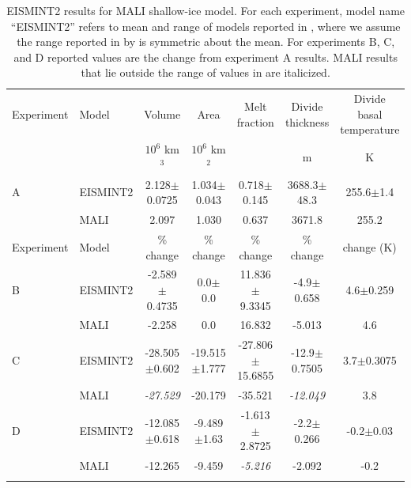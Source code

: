 \begin{table}[t]
\caption{EISMINT2 results for MALI shallow-ice model.
For each experiment, model name ``EISMINT2'' refers to mean and range of models reported in \citet{payne2000}, 
where we assume the range reported in by \citet{payne2000} is symmetric about the mean.
For experiments B, C, and D reported values are the change from experiment A results.
MALI results that lie outside the range of values in \citet{payne2000} are italicized.
}
\begin{tabular}{llccccc}
\tophline
Experiment & Model  &  Volume & Area & Melt fraction & Divide thickness & Divide basal temperature \\
           &        &  $10^6$ km$^3$ & $10^6$ km$^2$ & & m & K \\
\middlehline
A          & EISMINT2 & 2.128$\pm$0.0725 & 1.034$\pm$0.043 & 0.718$\pm$0.145 & 3688.3$\pm$48.3 & 255.6$\pm$1.4  \\
           & MALI   & 2.097          & 1.030         & 0.637         & 3671.8        & 255.2  \\  %
\middlehline
Experiment & Model  &  \% change & \% change & \% change & \% change & change (K)\\
\middlehline
B          & EISMINT2 & -2.589$\pm$0.4735 & 0.0$\pm$0.0 & 11.836$\pm$9.3345 & -4.9$\pm$0.658 & 4.6$\pm$0.259  \\
           & MALI   & -2.258   & 0.0 & 16.832 & -5.013 & 4.6  \\  %
C          & EISMINT2 & -28.505$\pm$0.602 & -19.515$\pm$1.777 & -27.806$\pm$15.6855 & -12.9$\pm$0.7505 & 3.7$\pm$0.3075\\
           & MALI   & \it{-27.529} & -20.179 & -35.521 & \it{-12.049} & 3.8  \\    %
D          & EISMINT2 & -12.085$\pm$0.618 & -9.489$\pm$1.63 & -1.613$\pm$2.8725 & -2.2$\pm$0.266 & -0.2$\pm$0.03 \\
           & MALI   & -12.265 & -9.459 & \it{-5.216} & -2.092 & -0.2  \\        %
\bottomhline
\end{tabular}
\belowtable{} %
 \label{table-EISMINT2}
\end{table}


